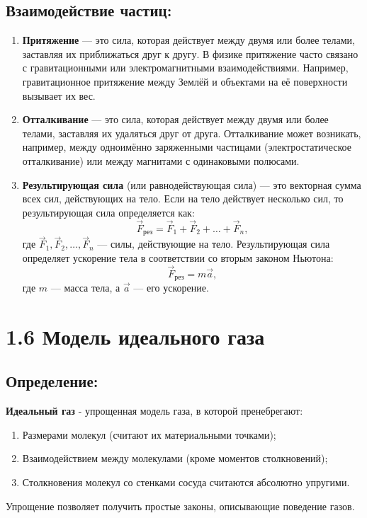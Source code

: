 \documentclass[a4paper,12pt]{article}
\begin{document}
\subsection*{Взаимодействие частиц:}
\vspace{-3pt}
\begin{enumerate} [itemsep=0pt, topsep=0pt, parsep=0pt]
    \item \textbf{Притяжение} — это сила, которая действует между двумя или более телами, заставляя их приближаться друг к другу. В физике притяжение часто связано с гравитационными или электромагнитными взаимодействиями. Например, гравитационное притяжение между Землёй и объектами на её поверхности вызывает их вес.
    \item \textbf{Отталкивание} — это сила, которая действует между двумя или более телами, заставляя их удаляться друг от друга. Отталкивание может возникать, например, между одноимённо заряженными частицами (электростатическое отталкивание) или между магнитами с одинаковыми полюсами.
    \item \textbf{Результирующая сила} (или равнодействующая сила) — это векторная сумма всех сил, действующих на тело. Если на тело действует несколько сил, то результирующая сила определяется как:
    $$ \vec{F}_{\text{рез}} = \vec{F}_1 + \vec{F}_2 + \dots + \vec{F}_n, $$
    где $\vec{F}_1, \vec{F}_2, \dots, \vec{F}_n$ — силы, действующие на тело. Результирующая сила определяет ускорение тела в соответствии со вторым законом Ньютона:
    $$\vec{F}_{\text{рез}} = m \vec{a},$$
    где $m$ — масса тела, а $\vec{a}$ — его ускорение.
\end{enumerate}
    
    
\newpage


\section*{1.6 Модель идеального газа}

\vspace{-9pt}
\subsection*{Определение:}
\vspace{-3pt}
\textbf{Идеальный газ} - упрощенная модель газа, в которой пренебрегают:
\begin{enumerate} [itemsep=0pt, topsep=0pt, parsep=0pt]
    \item Размерами молекул (считают их материальными точками);
    \item Взаимодействием между молекулами (кроме моментов столкновений);
    \item Столкновения молекул со стенками сосуда считаются абсолютно упругими.
\end{enumerate}
Упрощение позволяет получить простые законы, описывающие поведение газов.
\end{document}
